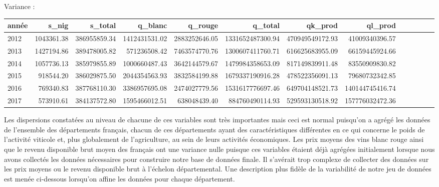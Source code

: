 \documentclass[11pt, a4paper]{article}
\begin{document}
\begin{landscape}
Variance :
\FloatBarrier
\begin{tabular}{lrrrrrrrrrrrr}
    \hline
   année & s\_nig & s\_total & q\_blanc & q\_rouge & q\_total & qk\_prod & ql\_prod \\
    \hline
    2012 & 1043361.38 & 386955859.34 & 1412431531.02 & 2883252646.05 & 1331652487300.94 & 470949549172.93 & 41009340396.57 \\
    2013 & 1427194.86 & 389478005.82 & 571236508.42 & 7463574770.76 & 1300607411760.71 & 616625683955.09 & 66159445924.66 \\
    2014 & 1057736.13 & 385979855.89 & 1000660487.43 & 3642144579.67 & 1479984358653.09 & 817149839911.48 & 83550909830.82 \\
    2015 & 918544.20 & 386029875.50 & 2044354563.93 & 3832584199.88 & 1679337190916.28 & 478522356091.13 & 79680732342.85 \\
    2016 & 769340.83 & 387768110.30 & 3386957695.08 & 2474027779.56 & 1531617776697.46 & 649704148521.73 & 140144745416.74 \\
    2017 & 573910.61 & 384137572.80 & 1595466012.51 & 638048439.40 & 884760490114.93 & 529593130518.92 & 157776032472.36 \\
     \hline
  \end{tabular}
\FloatBarrier 
Les dispersions constatées au niveau de chacune de ces variables sont très importantes mais ceci est normal puisqu’on a agrégé les données de l’ensemble des départements français, chacun de ces départements ayant des caractéristiques différentes en ce qui concerne le poids de l’activité viticole et, plus globalement de l’agriculture, au sein de leurs activités économiques. 
Les prix moyens des vins blanc  rouge ainsi que le revenu disponible brut moyen des français ont une variance nulle puisque ces variables étaient déjà agrégées initialement lorsque nous avons collectés les données nécessaires pour construire notre base de données finale.  
Il s’avérait trop complexe de collecter des données sur les prix moyens ou le revenu disponible brut à l’échelon départemental. 
Une description plus fidèle de la variabilité de notre jeu de données est menée ci-dessous lorsqu’on affine les données pour chaque département. 

\end{landscape}
\newpage
\end{document}
